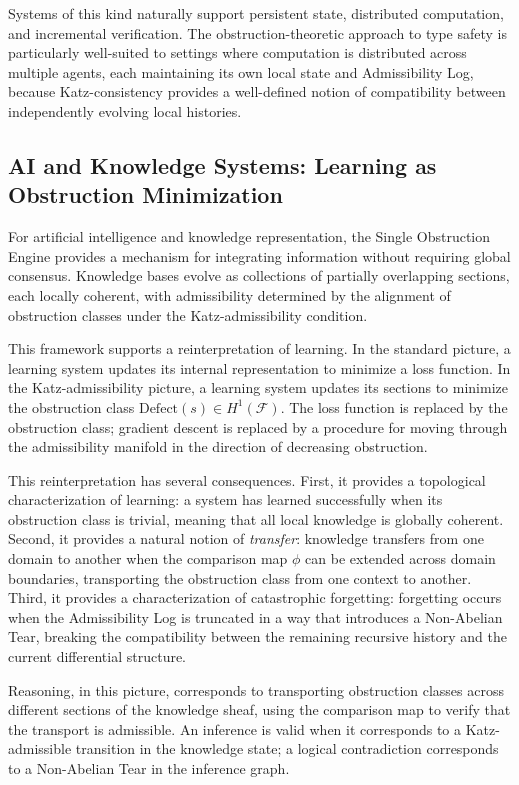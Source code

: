 \documentclass[12pt]{article}
\begin{document}
Systems of this kind naturally support persistent state, distributed computation, and
incremental verification. The obstruction-theoretic approach to type safety is
particularly well-suited to settings where computation is distributed across multiple
agents, each maintaining its own local state and Admissibility Log, because
Katz-consistency provides a well-defined notion of compatibility between independently
evolving local histories.

\subsection{AI and Knowledge Systems: Learning as Obstruction Minimization}

For artificial intelligence and knowledge representation, the Single Obstruction Engine
provides a mechanism for integrating information without requiring global consensus.
Knowledge bases evolve as collections of partially overlapping sections, each locally
coherent, with admissibility determined by the alignment of obstruction classes under
the Katz-admissibility condition.

This framework supports a reinterpretation of learning. In the standard picture, a
learning system updates its internal representation to minimize a loss function. In
the Katz-admissibility picture, a learning system updates its sections to minimize the
obstruction class $\mathrm{Defect}(s) \in H^1(\mathcal{F})$. The loss function is
replaced by the obstruction class; gradient descent is replaced by a procedure for
moving through the admissibility manifold in the direction of decreasing obstruction.

This reinterpretation has several consequences. First, it provides a topological
characterization of learning: a system has learned successfully when its obstruction
class is trivial, meaning that all local knowledge is globally coherent. Second, it
provides a natural notion of \emph{transfer}: knowledge transfers from one domain to
another when the comparison map $\phi$ can be extended across domain boundaries,
transporting the obstruction class from one context to another. Third, it provides a
characterization of catastrophic forgetting: forgetting occurs when the Admissibility
Log is truncated in a way that introduces a Non-Abelian Tear, breaking the compatibility
between the remaining recursive history and the current differential structure.

Reasoning, in this picture, corresponds to transporting obstruction classes across
different sections of the knowledge sheaf, using the comparison map to verify that the
transport is admissible. An inference is valid when it corresponds to a Katz-admissible
transition in the knowledge state; a logical contradiction corresponds to a
Non-Abelian Tear in the inference graph.
\end{document}
